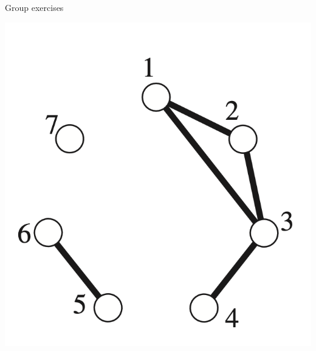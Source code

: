 \documentclass[10pt]{beamer}
\begin{document}
\begin{frame}{Group exercises}
\begin{minipage}[c]{0.38\textwidth}
    \includegraphics[width=\textwidth]{images/simple_graph.png}
\end{minipage}%

\end{frame}
\end{document}
